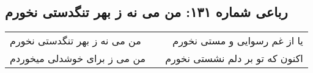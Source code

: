 \begin{center}
\section*{رباعی شماره ۱۳۱: من می نه ز بهر تنگدستی نخورم}
\label{sec:sh131}
\begin{longtable}{l p{0.5cm} r}
من می نه ز بهر تنگدستی نخورم
&&
یا از غم رسوایی و مستی نخورم
\\
من می ز برای خوشدلی میخوردم
&&
اکنون که تو بر دلم نشستی نخورم
\\
\end{longtable}
\end{center}
